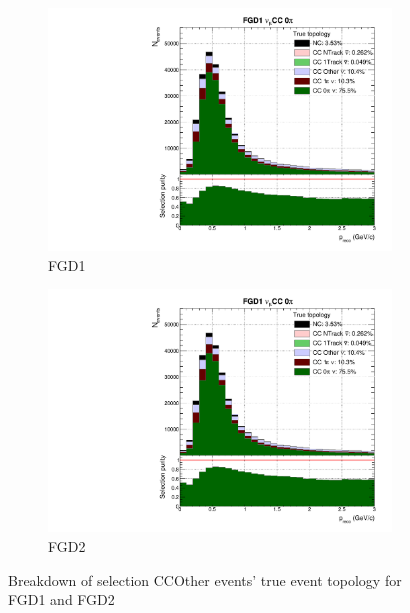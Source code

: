 \begin{figure}[h]
	\begin{subfigure}[t]{0.49\textwidth}
		\includegraphics[width=\textwidth,page=5, trim={0mm 0mm 0mm 9mm}, clip]{figures/mach3/selection/2017b_Diag_WithSelection}
		\caption{FGD1}
	\end{subfigure}
	\begin{subfigure}[t]{0.49\textwidth}
		\includegraphics[width=\textwidth,page=11, trim={0mm 0mm 0mm 9mm}, clip]{figures/mach3/selection/2017b_Diag_WithSelection}
		\caption{FGD2}
	\end{subfigure}
	\caption{Breakdown of selection CCOther events' true event topology for FGD1 and FGD2 }
	\label{fig:ccoth_topology}
\end{figure}

